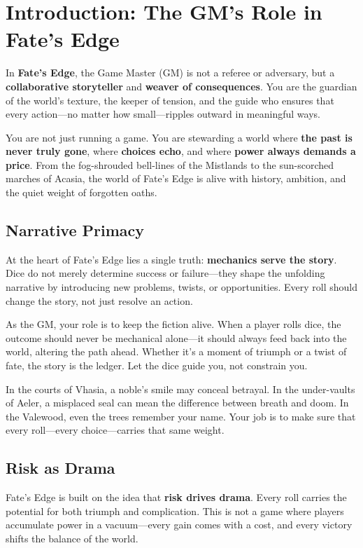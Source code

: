 \chapter*{Introduction: The GM’s Role in Fate’s Edge}

In \textbf{Fate’s Edge}, the Game Master (GM) is not a referee or adversary, but a \textbf{collaborative storyteller} and \textbf{weaver of consequences}. You are the guardian of the world’s texture, the keeper of tension, and the guide who ensures that every action—no matter how small—ripples outward in meaningful ways.

You are not just running a game. You are stewarding a world where \textbf{the past is never truly gone}, where \textbf{choices echo}, and where \textbf{power always demands a price}. From the fog-shrouded bell-lines of the Mistlands to the sun-scorched marches of Acasia, the world of Fate’s Edge is alive with history, ambition, and the quiet weight of forgotten oaths.

\section*{Narrative Primacy}

At the heart of Fate’s Edge lies a single truth: \textbf{mechanics serve the story}. Dice do not merely determine success or failure—they shape the unfolding narrative by introducing new problems, twists, or opportunities. Every roll should change the story, not just resolve an action.

As the GM, your role is to keep the fiction alive. When a player rolls dice, the outcome should never be mechanical alone—it should always feed back into the world, altering the path ahead. Whether it's a moment of triumph or a twist of fate, the story is the ledger. Let the dice guide you, not constrain you.

In the courts of Vhasia, a noble’s smile may conceal betrayal. In the under-vaults of Aeler, a misplaced seal can mean the difference between breath and doom. In the Valewood, even the trees remember your name. Your job is to make sure that every roll—every choice—carries that same weight.

\section*{Risk as Drama}

Fate’s Edge is built on the idea that \textbf{risk drives drama}. Every roll carries the potential for both triumph and complication. This is not a game where players accumulate power in a vacuum—every gain comes with a cost, and every victory shifts the balance of the world.

